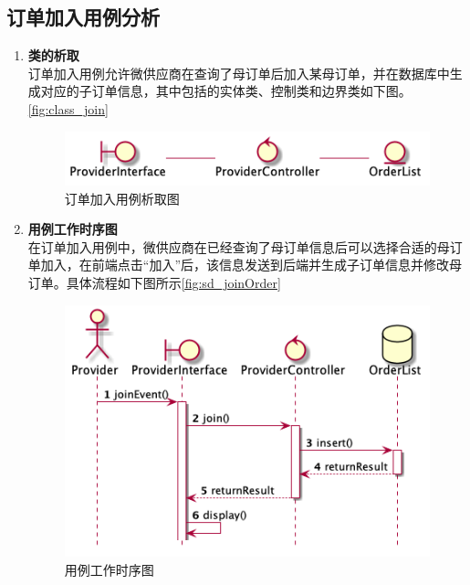 	\subsection{订单加入用例分析} %
	\label{sub:订单加入用例分析}
	\begin{enumerate}
		\item \textbf{类的析取} \\
		订单加入用例允许微供应商在查询了母订单后加入某母订单，并在数据库中生成对应的子订单信息，其中包括的实体类、控制类和边界类如下图。
		\autoref{fig:class_join}
		\begin{figure}[htp]
		    \centering
		    \includegraphics[width=12cm]{misc/figure_src/class_diagram/join.png}
		    \caption{订单加入用例析取图}
		    \label{fig:class_join}
		\end{figure}

		\item \textbf{用例工作时序图} \\
		在订单加入用例中，微供应商在已经查询了母订单信息后可以选择合适的母订单加入，在前端点击“加入”后，该信息发送到后端并生成子订单信息并修改母订单。具体流程如下图所示\autoref{fig:sd_joinOrder}

		\begin{figure}[htp]
		    \centering
		    \includegraphics[width=12cm]{misc/figure_src/sequence_diagram/sd_joinOrder.png}
		    \caption{用例工作时序图}
		    \label{fig:sd_joinOrder}
		\end{figure}
	\end{enumerate}
	
